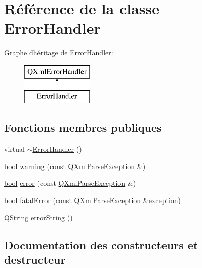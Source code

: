 \hypertarget{class_error_handler}{}\section{Référence de la classe Error\+Handler}
\label{class_error_handler}
Graphe d\textquotesingle{}héritage de Error\+Handler\+:\begin{figure}[H]
\begin{center}
\leavevmode
\includegraphics[height=2.000000cm]{class_error_handler}
\end{center}
\end{figure}
\subsection*{Fonctions membres publiques}
\begin{DoxyCompactItemize}
\item 
virtual \hyperlink{class_error_handler_acc5355422f332b7057295bda1d4e702b}{$\sim$\+Error\+Handler} ()
\item 
\hyperlink{qglobal_8h_a1062901a7428fdd9c7f180f5e01ea056}{bool} \hyperlink{class_error_handler_abb147190a3d48dae251d7db795d9e28d}{warning} (const \hyperlink{class_q_xml_parse_exception}{Q\+Xml\+Parse\+Exception} \&)
\item 
\hyperlink{qglobal_8h_a1062901a7428fdd9c7f180f5e01ea056}{bool} \hyperlink{class_error_handler_a691ab0beb4cd9ba9fbc82b850ad533a3}{error} (const \hyperlink{class_q_xml_parse_exception}{Q\+Xml\+Parse\+Exception} \&)
\item 
\hyperlink{qglobal_8h_a1062901a7428fdd9c7f180f5e01ea056}{bool} \hyperlink{class_error_handler_abb20bb96f3b3b743e1d5649d6c6be5a0}{fatal\+Error} (const \hyperlink{class_q_xml_parse_exception}{Q\+Xml\+Parse\+Exception} \&exception)
\item 
\hyperlink{class_q_string}{Q\+String} \hyperlink{class_error_handler_a193381152001d019c4155600a61c478d}{error\+String} ()
\end{DoxyCompactItemize}


\subsection{Documentation des constructeurs et destructeur}
\hypertarget{class_error_handler_acc5355422f332b7057295bda1d4e702b}{}
